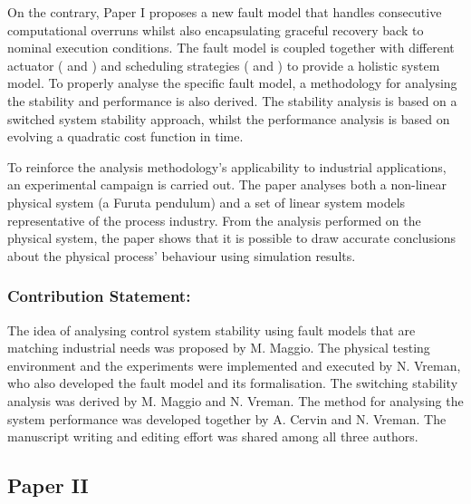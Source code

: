 On the contrary, Paper I proposes a new fault model that handles consecutive computational overruns whilst also encapsulating graceful recovery back to nominal execution conditions.
The fault model is coupled together with different actuator (\tZ{} and \tH{}) and scheduling strategies (\tK{} and \tS{}) to provide a holistic system model.
To properly analyse the specific fault model, a methodology for analysing the stability and performance is also derived.
The stability analysis is based on a switched system stability approach, whilst the performance analysis is based on evolving a quadratic cost function in time.

To reinforce the analysis methodology's applicability to industrial applications, an experimental campaign is carried out.
The paper analyses both a non-linear physical system (a Furuta pendulum) and a set of linear system models representative of the process industry.
From the analysis performed on the physical system, the paper shows that it is possible to draw accurate conclusions about the physical process' behaviour using simulation results.

\subsubsection*{Contribution Statement:}%
%
The idea of analysing control system stability using fault models that are matching industrial needs was proposed by M. Maggio.
The physical testing environment and the experiments were implemented and executed by N. Vreman, who also developed the fault model and its formalisation.
The switching stability analysis was derived by M. Maggio and N. Vreman.
The method for analysing the system performance was developed together by A. Cervin and N. Vreman.
The manuscript writing and editing effort was shared among all three authors.


\subsection*{Paper II}%
%
\begin{quote}
\end{quote}

